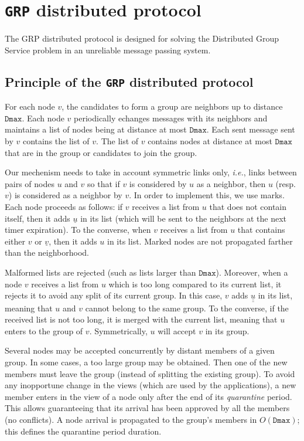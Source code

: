 \documentclass[11pt,english]{article}
\newcommand{\Latin}[1]{\textit{#1}}
\newcommand{\ie}{\Latin{i.e.},\xspace}
\begin{document}
\section{\texttt{GRP} distributed protocol}\label{s:algo}

The GRP distributed protocol is designed for solving the Distributed Group
Service problem in an unreliable message passing system.

\subsection{Principle of the \texttt{GRP} distributed protocol} 
For each node $v$, the candidates to form a group are neighbors up to distance
$\texttt{Dmax}$.  Each node $v$ periodically echanges messages with its neighbors and 
maintains a list of nodes being at distance at most $\texttt{Dmax}$. 
Each sent message sent by $v$ contains the list of $v$.  The list of $v$ contains nodes at 
distance at most $\texttt{Dmax}$ that are in the group or candidates to join the group. 

Our mechenism needs to take in account symmetric links only, \ie links between pairs of nodes
$u$ and $v$ so that if $v$ is considered by $u$ as a neighbor, then $u$ 
(resp. $v$) is considered as a neighbor by $v$. 
In order to implement this, we use marks.  Each node proceeds as follows:
if $v$ receives a
list from $u$ that does not contain itself, then it adds $\underline{u}$ in its
list (which will be sent to the neighbors at the next timer expiration). To the
converse, when $v$ receives a list from $u$ that contains either $v$ or
$\underline{v}$, then it adds $u$ in its list. Marked nodes are not propagated
farther than the neighborhood.

Malformed lists are rejected (such as lists larger than $\texttt{Dmax}$).
Moreover, when a node $v$ receives a list from $u$ which is too long compared to
its current list, it rejects it to avoid any split of its current group. In this
case, $v$ adds $\underline{\underline{u}}$ in its list, meaning that $u$ and $v$
cannot belong to the same group. To the converse, if the received list is not
too long, it is merged with the current list, meaning that $u$ enters to the
group of $v$. Symmetrically, $u$ will accept $v$ in its group.

Several nodes may be accepted concurrently by distant members of a given
group. In some cases, a too large group may be obtained. Then one of the new
members must leave the group (instead of splitting the existing group).  To
avoid any inopportune change in the views (which are used by the applications),
a new member enters in the view of a node only after the end of its
\emph{quarantine} period. This allows guaranteeing that its arrival has been
approved by all the members (no conflicts). A node arrival is propagated to the
group's members in $O(\texttt{Dmax})$; this defines the quarantine period
duration.
\end{document}
